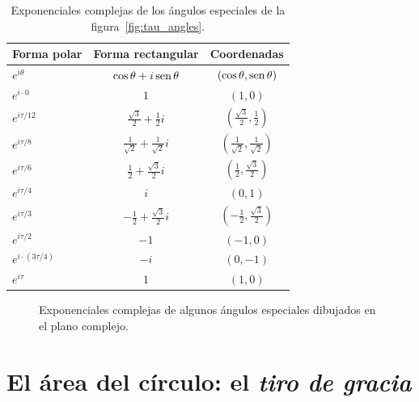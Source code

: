\begin{table}
\begin{center}
\begin{tabular}{lcc}
Forma polar & Forma rectangular & Coordenadas \\ \hline\hline
$e^{i\theta}$ & $\cos\theta + i\,\mbox{sen}\,\theta$ & $(\cos\theta, \mbox{sen}\,\theta)$ \\ \hline
$e^{i\cdot0}$ & $1$ & $(1, 0)$ \smallskip \\
$e^{i\tau/12}$ & $\frac{\sqrt{3}}{2} + \frac{1}{2}i$ & $(\frac{\sqrt{3}}{2}, \frac{1}{2})$ \smallskip \\
$e^{i\tau/8}$ & $\frac{1}{\sqrt{2}} +  \frac{1}{\sqrt{2}}i$ & $(\frac{1}{\sqrt{2}}, \frac{1}{\sqrt{2}})$ \smallskip \\
$e^{i\tau/6}$ & $\frac{1}{2} +\frac{\sqrt{3}}{2} i$ & $(\frac{1}{2}, \frac{\sqrt{3}}{2})$ \smallskip \\
$e^{i\tau/4}$ & $i$ & $(0, 1)$ \smallskip \\
$e^{i\tau/3}$ & $-\frac{1}{2} +\frac{\sqrt{3}}{2} i$ & $(-\frac{1}{2}, \frac{\sqrt{3}}{2})$ \smallskip \\
$e^{i\tau/2}$ & $-1$ & $(-1, 0)$ \smallskip \\
$e^{i\cdot(3\tau/4)}$ & $-i$ & $(0, -1)$ \smallskip \\
$e^{i\tau}$ & $1$ & $(1, 0)$
\end{tabular}
\end{center}
\caption{Exponenciales complejas de los ángulos especiales de la figura~\ref{fig:tau_angles}.\label{table:complex_exponentials}}
\end{table}

\begin{figure}
\begin{center}
\end{center}
\caption{Exponenciales complejas de algunos ángulos especiales dibujados en el plano complejo.\label{fig:tau_euler_circle}}
\end{figure}


\section{El área del círculo: el \emph{tiro de gracia}} %
\label{sec:circular_area}


